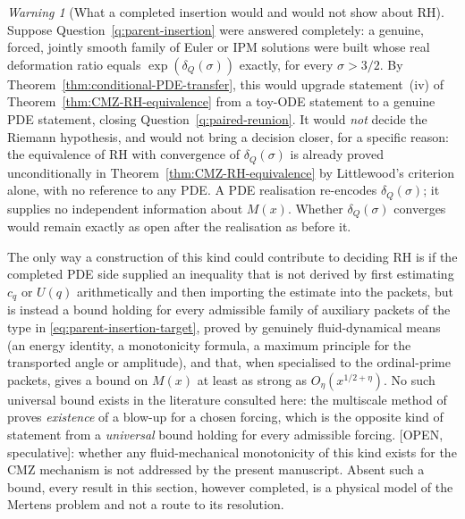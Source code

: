 \documentclass[11pt]{amsart}
\numberwithin{equation}{section}
\theoremstyle{plain}
\theoremstyle{definition}
\theoremstyle{remark}
\newtheorem{warning}[theorem]{Warning}
\begin{document}
\begin{warning}[What a completed insertion would and would not show about RH]
\label{warn:no-progress-without-independent-bound}
Suppose Question~\ref{q:parent-insertion} were answered completely: a
genuine, forced, jointly smooth family of Euler or IPM solutions were built
whose real deformation ratio equals $\exp(\delta_Q(\sigma))$ exactly, for
every $\sigma>3/2$.  By Theorem~\ref{thm:conditional-PDE-transfer}, this
would upgrade statement~(iv) of Theorem~\ref{thm:CMZ-RH-equivalence} from a
toy-ODE statement to a genuine PDE statement, closing
Question~\ref{q:paired-reunion}.  It would \emph{not} decide the Riemann
hypothesis, and would not bring a decision closer, for a specific reason:
the equivalence of RH with convergence of $\delta_Q(\sigma)$ is already
proved unconditionally in Theorem~\ref{thm:CMZ-RH-equivalence} by
Littlewood's criterion alone, with no reference to any PDE.  A PDE
realisation re-encodes $\delta_Q(\sigma)$; it supplies no independent
information about $M(x)$.  Whether $\delta_Q(\sigma)$ converges would remain
exactly as open after the realisation as before it.

The only way a construction of this kind could contribute to deciding RH is
if the completed PDE side supplied an inequality that is not derived by
first estimating $c_q$ or $U(q)$ arithmetically and then importing the
estimate into the packets, but is instead a bound holding for every
admissible family of auxiliary packets of the type in
\eqref{eq:parent-insertion-target}, proved by genuinely fluid-dynamical
means (an energy identity, a monotonicity formula, a maximum principle for
the transported angle or amplitude), and that, when specialised to the
ordinal-prime packets, gives a bound on $M(x)$ at least as strong as
$O_\eta(x^{1/2+\eta})$.  No such universal bound exists in the literature
consulted here: the multiscale method of
\cite{CordobaMartinezZoroa2023,CordobaMartinezZoroaZheng2023,AlpogeBuckmasterCoiculescu2026,AlpogeBuckmaster2026}
proves \emph{existence} of a blow-up for a chosen forcing, which is the
opposite kind of statement from a \emph{universal} bound holding for every
admissible forcing.  \textup{[OPEN, speculative]}: whether any
fluid-mechanical monotonicity of this kind exists for the CMZ mechanism is
not addressed by the present manuscript.  Absent such a bound, every result
in this section, however completed, is a physical model of the Mertens
problem and not a route to its resolution.
\end{warning}
\end{document}
